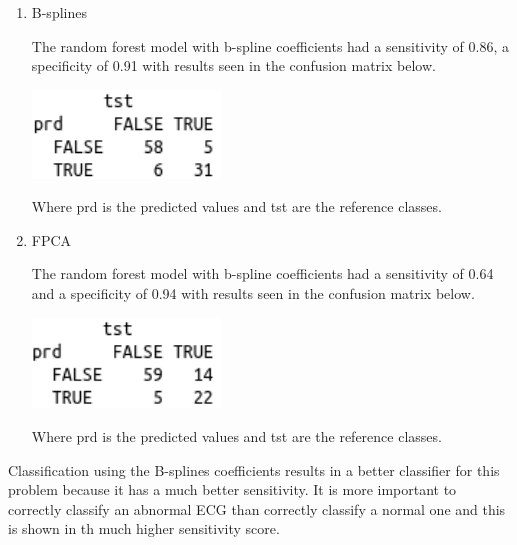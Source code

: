 \documentclass[12pt,letterpaper]{article}
\begin{document}
\begin{enumerate}[label=\alph*)]


\item B-splines

The random forest model with b-spline coefficients had a sensitivity of 0.86, a specificity of 0.91 with results seen in the confusion matrix below.  

\begin{center}
\includegraphics[width=5cm]{conf_bspline.png} 
\end{center}

Where prd is the predicted values and tst are the reference classes.

\item FPCA

The random forest model with b-spline coefficients had a sensitivity of 0.64 and a specificity of 0.94 with results seen in the confusion matrix below.

\begin{center}
\includegraphics[width=5cm]{conf_fpca.png} 
\end{center}


Where prd is the predicted values and tst are the reference classes.

\end{enumerate}

Classification using the B-splines coefficients results in a better classifier for this problem because it has a much better sensitivity. It is more important to correctly classify an abnormal ECG than correctly classify a normal one and this is shown in th much higher sensitivity score. 
\end{document}
